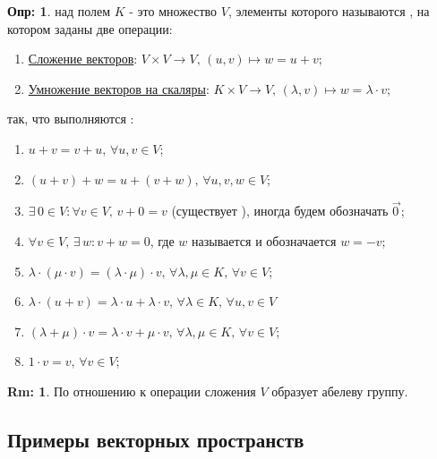 \documentclass[12pt]{article}
\theoremstyle{definition}
\newtheorem{defn}{Опр:}
\newtheorem{rem}{Rm:}
\newcommand{\vecm}[1]{\overrightarrow{#1\,}}
\begin{document}
\begin{defn}
	 над полем $K$ - это множество $V$, элементы которого называются , на котором заданы две операции:
	\begin{enumerate}[label=\arabic*)]
		\item \uline{Сложение векторов}: $V \times V \to V, \, (u,v) \mapsto w = u + v$;
		\item \uline{Умножение векторов на скаляры}: $K \times V \to V,\, (\lambda, v) \mapsto w = \lambda {\cdot}v$; 
	\end{enumerate}
	так, что выполняются :
	\begin{enumerate}[label=(\arabic*)]
		\item $u + v = v + u, \, \forall u,v \in V$;
		\item $(u + v) + w = u + (v + w), \, \forall u,v,w \in V$;
		\item $\exists \, 0 \in V \colon \forall v \in V, \, v + 0 = v$ (существует ), иногда будем обозначать $\vecm{0}$;
		\item $\forall v \in V, \, \exists \, w \colon v + w = 0$, где $w$ называется  и обозначается $w = -v$;
		\item $\lambda{\cdot}(\mu{\cdot}v) =(\lambda{\cdot}\mu){\cdot}v, \, \forall \lambda, \mu \in K, \, \forall v \in V$;
		\item $\lambda{\cdot}(u + v) = \lambda{\cdot}u + \lambda{\cdot}v, \, \forall \lambda \in K, \, \forall u,v \in V$
		\item $(\lambda + \mu){\cdot}v = \lambda{\cdot}v + \mu{\cdot}v, \, \forall \lambda, \mu \in K, \, \forall v \in V$;
		\item $1 {\cdot}v = v, \, \forall v \in V$;
	\end{enumerate}
\end{defn}
\begin{rem}
	По отношению к операции сложения $V$ образует абелеву группу.
\end{rem}

\subsection*{Примеры векторных пространств}
\end{document}
